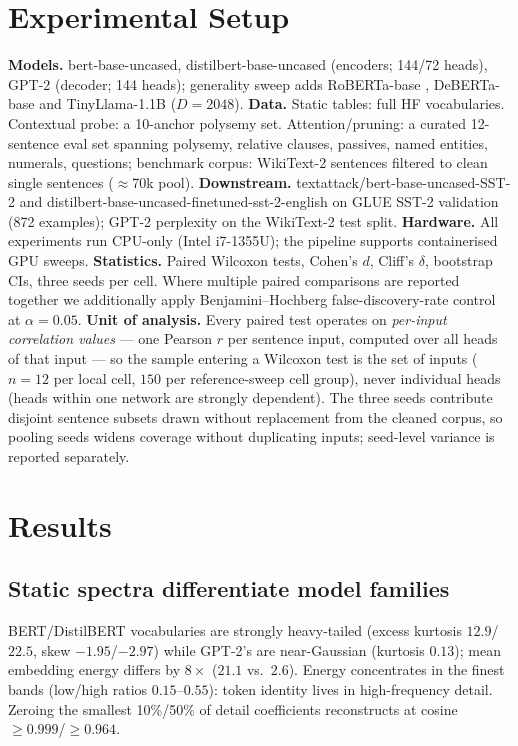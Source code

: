 \documentclass[conference]{IEEEtran}
\begin{document}
\section{Experimental Setup}
\textbf{Models.} bert-base-uncased, distilbert-base-uncased (encoders;
144/72 heads), GPT-2 (decoder; 144 heads); generality sweep adds
RoBERTa-base \cite{liu2019}, DeBERTa-base \cite{he2021} and
TinyLlama-1.1B \cite{zhang2024} ($D{=}2048$).
\textbf{Data.} Static tables: full HF vocabularies. Contextual probe: a
10-anchor polysemy set. Attention/pruning: a curated 12-sentence eval
set spanning polysemy, relative clauses, passives, named entities,
numerals, questions; benchmark corpus: WikiText-2 sentences
\cite{merity2017} filtered to clean single sentences ($\approx$70k pool).
\textbf{Downstream.} textattack/bert-base-uncased-SST-2 and
distilbert-base-uncased-finetuned-sst-2-english on GLUE SST-2
validation (872 examples); GPT-2 perplexity on the WikiText-2 test split.
\textbf{Hardware.} All experiments run CPU-only (Intel i7-1355U); the
pipeline supports containerised GPU sweeps.
\textbf{Statistics.} Paired Wilcoxon tests, Cohen's $d$, Cliff's
$\delta$, bootstrap CIs, three seeds per cell. Where multiple paired
comparisons are reported together we additionally apply
Benjamini--Hochberg false-discovery-rate control at $\alpha{=}0.05$.
\textbf{Unit of analysis.} Every paired test operates on \emph{per-input
correlation values} --- one Pearson $r$ per sentence input, computed over
all heads of that input --- so the sample entering a Wilcoxon test is the
set of inputs ($n{=}12$ per local cell, $150$ per reference-sweep cell
group), never individual heads (heads within one network are strongly
dependent). The three seeds contribute disjoint sentence subsets drawn
without replacement from the cleaned corpus, so pooling seeds widens
coverage without duplicating inputs; seed-level variance is reported
separately.

\section{Results}
\subsection{Static spectra differentiate model families}
BERT/DistilBERT vocabularies are strongly heavy-tailed (excess kurtosis
$12.9$/$22.5$, skew $-1.95$/$-2.97$) while GPT-2's are near-Gaussian
(kurtosis $0.13$); mean embedding energy differs by $8\times$
($21.1$ vs.\ $2.6$). Energy concentrates in the finest bands (low/high
ratios $0.15$--$0.55$): token identity lives in high-frequency detail.
Zeroing the smallest 10\%/50\% of detail coefficients reconstructs at
cosine $\geq0.999$/$\geq0.964$.
\end{document}
